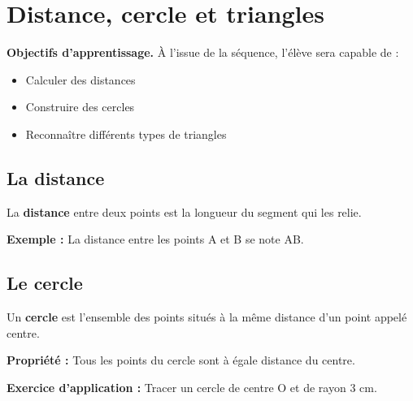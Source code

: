 \chapter{Distance, cercle et triangles}

\begin{objectifsbox}
\textbf{Objectifs d'apprentissage.} À l'issue de la séquence, l'élève sera capable de :
\begin{itemize}
\item Calculer des distances
\item Construire des cercles
\item Reconnaître différents types de triangles
\end{itemize}
\end{objectifsbox}

\section{La distance}

\begin{definitionbox}
La \textbf{distance} entre deux points est la longueur du segment qui les relie.
\end{definitionbox}

\begin{examplebox}
\textbf{Exemple :} La distance entre les points A et B se note AB.
\end{examplebox}

\section{Le cercle}

\begin{definitionbox}
Un \textbf{cercle} est l'ensemble des points situés à la même distance d'un point appelé centre.
\end{definitionbox}

\begin{proprietebox}
\textbf{Propriété :} Tous les points du cercle sont à égale distance du centre.
\end{proprietebox}

\begin{exercisebox}
\textbf{Exercice d'application :}
Tracer un cercle de centre O et de rayon 3 cm.
\end{exercisebox}
